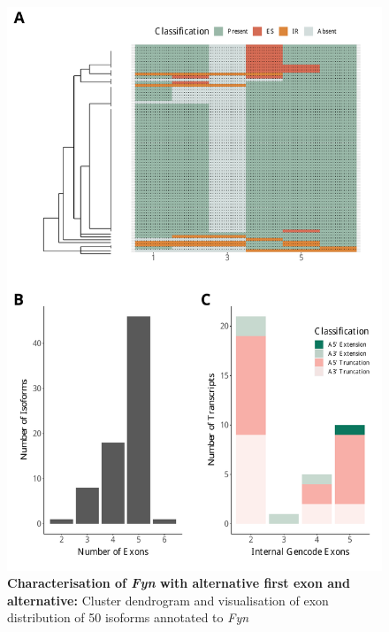 \begin{figure}[htp]
	\begin{center}
		\includegraphics[page=9,trim={1cm 20cm 0 2cm},scale = 0.55]{Figures/TargetGenes.pdf}
	\end{center}
	\captionsetup{width=0.95\textwidth}
	\caption[Characterisation of \textit{Fyn} with alternative first exon and alternative promoter usage]%
	{\textbf{Characterisation of \textit{Fyn} with alternative first exon and alternative:} Cluster dendrogram and visualisation of exon distribution of 50 isoforms annotated to \textit{Fyn}
	}   
	\label{fig:fyn}
\end{figure}

